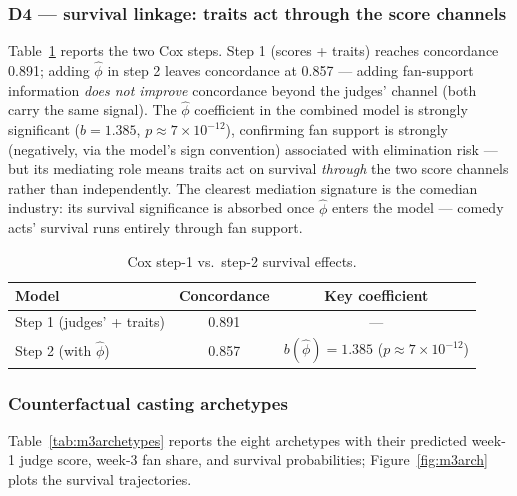 \documentclass[10pt]{article}
\begin{document}
\subsubsection{D4 --- survival linkage: traits act through the score channels}

Table~\ref{tab:m3survival} reports the two Cox steps. Step 1 (scores + traits) reaches
concordance 0.891; adding $\hat\phi$ in step 2 leaves concordance at 0.857 --- adding
fan-support information \emph{does not improve} concordance beyond the judges' channel
(both carry the same signal). The $\hat\phi$ coefficient in the combined model is strongly
significant ($b = 1.385$, $p \approx 7 \times 10^{-12}$), confirming fan support is
strongly (negatively, via the model's sign convention) associated with elimination risk ---
but its mediating role means traits act on survival \emph{through} the two score channels
rather than independently. The clearest mediation signature is the comedian industry:
its survival significance is absorbed once $\hat\phi$ enters the model --- comedy acts'
survival runs entirely through fan support.

\begin{table}[H]
\centering
\caption{Cox step-1 vs.\ step-2 survival effects.}
\label{tab:m3survival}
\begin{tabular}{lcc}
\toprule
Model & Concordance & Key coefficient \\
\midrule
Step 1 (judges' + traits) & 0.891 & --- \\
Step 2 (with $\hat\phi$)  & 0.857 & $b(\hat\phi) = 1.385$ ($p \approx 7 \times 10^{-12}$) \\
\bottomrule
\end{tabular}
\end{table}

\subsubsection{Counterfactual casting archetypes}

Table~\ref{tab:m3archetypes} reports the eight archetypes with their predicted week-1
judge score, week-3 fan share, and survival probabilities; Figure~\ref{fig:m3arch} plots
the survival trajectories.
\end{document}
